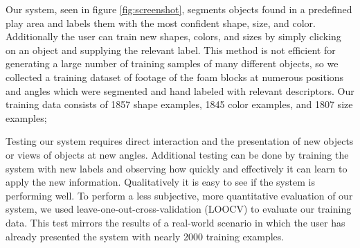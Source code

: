 \documentclass[11pt]{article}
\begin{document}
Our system, seen in figure \ref{fig:screenshot}, segments objects found in a
predefined play area and labels them with the most confident shape, size, and
color.  Additionally the user can train new shapes, colors, and sizes by simply
clicking on an object and supplying the relevant label. This method is not
efficient for generating a
large number of training samples of many different objects, so we collected a
training dataset of footage of the foam blocks at numerous positions and angles
which were segmented and hand labeled with relevant
descriptors. Our training data consists of 1857 shape examples, 1845 color
examples, and 1807 size examples;

\begin{figure}[h!]
\centering
{}
\caption{}
\label{fig:objects}
\end{figure}

Testing our system requires direct interaction and the presentation of new objects
or views of objects at new angles. Additional testing can be done by training the
system with new labels and observing how quickly and effectively it
can learn to apply the new information. Qualitatively it is easy to see
if the system is performing well. To perform a less subjective, more quantitative
evaluation of our system, we used leave-one-out-cross-validation (LOOCV) to
evaluate our training data. This test mirrors the results of a real-world
scenario in which the user has already presented the system with nearly 2000 training
examples.
\end{document}
